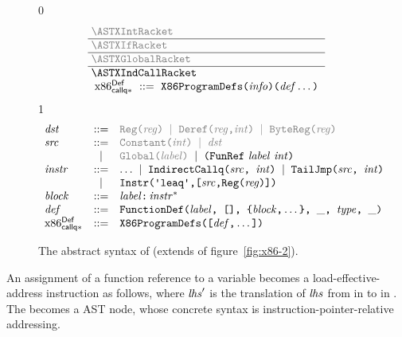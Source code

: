 \documentclass[7x10]{TimesAPriori_MIT}%
\newcommand{\gray}[1]{{\color{gray} #1}}
\def\racketEd{0}
\def\pythonEd{1}
\def\edition{1}
\newcommand{\pythonColor}[0]{}
\numberwithin{theorem}{chapter}
\numberwithin{definition}{chapter}
\numberwithin{equation}{chapter}
\begin{document}
\begin{figure}[tp]
  \begin{tcolorbox}[colback=white]
    \small
{\if\edition\racketEd
\[\arraycolsep=3pt
\begin{array}{l}
  \gray{\ASTXIntRacket} \\ \hline
  \gray{\ASTXIfRacket} \\ \hline
  \gray{\ASTXGlobalRacket} \\ \hline
  \ASTXIndCallRacket \\
\begin{array}{lcl}
\LangXIndCallM{} &::= & \XPROGRAMDEFS{\itm{info}}{\LP\Def\ldots\RP}
\end{array}
\end{array}
\]
\fi}
{\if\edition\pythonEd\pythonColor
\[
\begin{array}{lcl}
  \Dst &::=&  \gray{  \REG{\Reg} \MID \DEREF{\Reg}{\Int}
     \MID \BYTEREG{\Reg} } \\
  \Src &::=&  \gray{  \INT{\Int} \MID \Dst } \\
     &\MID& \gray{ \GLOBAL{\itm{label}} } \MID \FUNREF{\itm{label}}{\Int} \\
  \Instr &::=& \ldots \MID \INDCALLQ{\Src}{\itm{int}}
    \MID \TAILJMP{\Src}{\itm{int}}\\
    &\MID& \BININSTR{\scode{leaq}}{\Src}{\REG{\Reg}}\\
  \Block &::=&\itm{label}\key{:}\,\Instr^{*} \\
  \Def &::= & \DEF{\itm{label}}{\LS\RS}{\LC\Block\code{,}\ldots\RC}{\_}{\Type}{\_} \\
\LangXIndCallM{} &::= & \XPROGRAMDEFS{\LS\Def\code{,}\ldots\RS}
\end{array}
\]
\fi}
  \end{tcolorbox}
\caption{The abstract syntax of \LangXIndCall{} (extends
  \LangXGlobal{} of figure~\ref{fig:x86-2}).}
\label{fig:x86-3}
\end{figure}

An assignment of a function reference to a variable becomes a
load-effective-address instruction as follows, where $\mathit{lhs}'$ is
the translation of $\mathit{lhs}$ from \Atm{} in \LangCFun{} to \Src{} in
\LangXIndCallVar{}. The  becomes a  AST
node, whose concrete syntax is instruction-pointer-relative
addressing.
\end{document}
